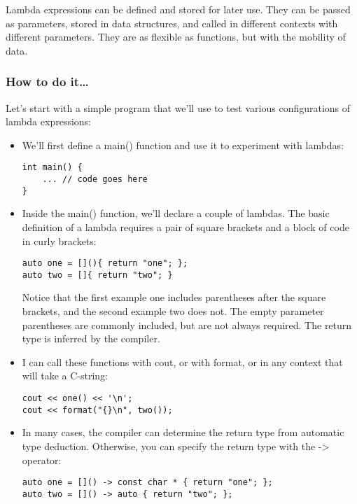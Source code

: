 
Lambda expressions can be defined and stored for later use. They can be passed as parameters, stored in data structures, and called in different contexts with different parameters. They are as flexible as functions, but with the mobility of data.

\subsubsection{How to do it…}

Let's start with a simple program that we'll use to test various configurations of lambda expressions:

\begin{itemize}
\item 
We'll first define a main() function and use it to experiment with lambdas:

\begin{lstlisting}[style=styleCXX]
int main() {
	... // code goes here
}
\end{lstlisting}

\item 
Inside the main() function, we'll declare a couple of lambdas. The basic definition of a lambda requires a pair of square brackets and a block of code in curly brackets:

\begin{lstlisting}[style=styleCXX]
auto one = [](){ return "one"; };
auto two = []{ return "two"; }
\end{lstlisting}

Notice that the first example one includes parentheses after the square brackets, and the second example two does not. The empty parameter parentheses are commonly included, but are not always required. The return type is inferred by the compiler.

\item 
I can call these functions with cout, or with format, or in any context that will take a C-string:

\begin{lstlisting}[style=styleCXX]
cout << one() << '\n';
cout << format("{}\n", two());
\end{lstlisting}

\item 
In many cases, the compiler can determine the return type from automatic type deduction. Otherwise, you can specify the return type with the -> operator:

\begin{lstlisting}[style=styleCXX]
auto one = []() -> const char * { return "one"; };
auto two = []() -> auto { return "two"; };
\end{lstlisting}


\end{itemize}
